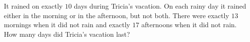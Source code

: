 It rained on exactly $10$ days during Tricia's vacation. On each rainy day it rained either in the morning or in the afternoon, but not both. There were exactly $13$ mornings when it did not rain and exactly $17$ afternoons when it did not rain. How many days did Tricia's vacation last?
